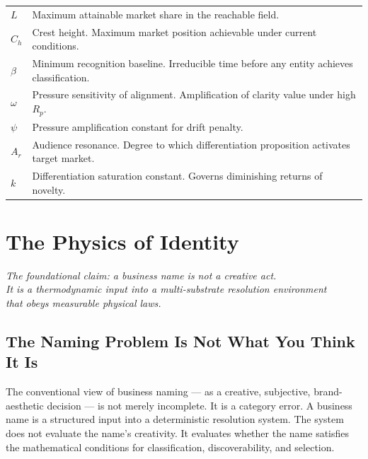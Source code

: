 \documentclass[12pt, openany]{book}
\theoremstyle{thmstyle}
\theoremstyle{defstyle}
\begin{document}
\begin{longtable}[l]{@{}p{1.4in} p{4.6in}@{}}
$L$ & Maximum attainable market share in the reachable field. \\[4pt]
$C_h$ & Crest height. Maximum market position achievable under current conditions. \\[4pt]
$\beta$ & Minimum recognition baseline. Irreducible time before any entity achieves classification. \\[4pt]
$\omega$ & Pressure sensitivity of alignment. Amplification of clarity value under high $R_p$. \\[4pt]
$\psi$ & Pressure amplification constant for drift penalty. \\[4pt]
$A_r$ & Audience resonance. Degree to which differentiation proposition activates target market. \\[4pt]
$k$ & Differentiation saturation constant. Governs diminishing returns of novelty. \\[4pt]
\end{longtable}

\newpage


\part{The Physics of Identity}

\vspace{16pt}
\begin{center}
\color{accentgray}\itshape
The foundational claim: a business name is not a creative act.\\
It is a thermodynamic input into a multi-substrate resolution environment\\
that obeys measurable physical laws.
\end{center}

\chapter{The Naming Problem Is Not What You Think It Is}

\begin{keybox}
The conventional view of business naming --- as a creative, subjective, brand-aesthetic decision --- is not merely incomplete. It is a category error. A business name is a structured input into a deterministic resolution system. The system does not evaluate the name's creativity. It evaluates whether the name satisfies the mathematical conditions for classification, discoverability, and selection.
\end{keybox}
\end{document}
